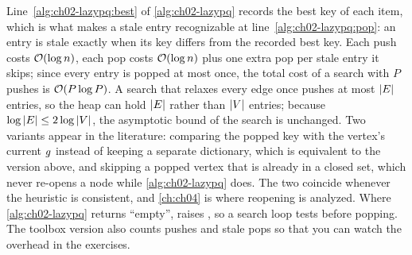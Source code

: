 \begin{algorithm}[htb]
\caption{Priority queue with lazy deletion}
\label{alg:ch02-lazypq}
\end{algorithm}

Line~\ref{alg:ch02-lazypq:best} of \cref{alg:ch02-lazypq} records the best key of each item, which is what makes a stale entry recognizable at line~\ref{alg:ch02-lazypq:pop}: an entry is stale exactly when its key differs from the recorded best key. Each push costs $\mathcal{O}\!\left(\log n\right)$, each pop costs $\mathcal{O}\!\left(\log n\right)$ plus one extra pop per stale entry it skips; since every entry is popped at most once, the total cost of a search with $P$ pushes is $\mathcal{O}\!\left(P\log P\right)$. A search that relaxes every edge once pushes at most $\left\lvert E \right\rvert$ entries, so the heap can hold $\left\lvert E \right\rvert$ rather than $\left\lvert V \right\rvert$ entries; because $\log\left\lvert E \right\rvert\le2\log\left\lvert V \right\rvert$, the asymptotic bound of the search is unchanged. Two variants appear in the literature: comparing the popped key with the vertex's current $g$ instead of keeping a separate dictionary, which is equivalent to the version above, and skipping a popped vertex that is already in a closed set, which never re-opens a node while \cref{alg:ch02-lazypq} does. The two coincide whenever the heuristic is consistent, and \cref{ch:ch04} is where reopening is analyzed. Where \cref{alg:ch02-lazypq} returns ``empty'',  raises , so a search loop tests  before popping. The toolbox version also counts pushes and stale pops so that you can watch the overhead in the exercises.

